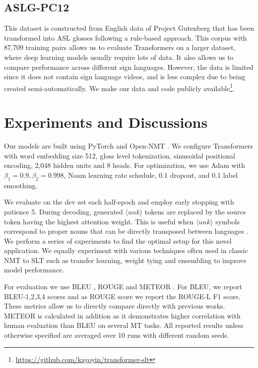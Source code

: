 \documentclass[11pt]{article}
\begin{document}
\subsection*{ASLG-PC12 \cite{asl}}  This dataset is constructed from English data of Project Gutenberg that has been transformed into ASL glosses following a rule-based approach. This corpus with 87,709 training pairs allows us to evaluate Transformers on a larger dataset, where deep learning models usually require lots of data. It also allows us to compare performance across different sign languages. However, the data is limited since it does not contain sign language videos, and is less complex due to being created semi-automatically. We make our data and code publicly available\footnote{\url{https://github.com/kayoyin/transformer-slt}}.



\section{Experiments and Discussions}
Our models are built using PyTorch \cite{pytorch} and Open-NMT \cite{opennmt}. We configure Transformers with word embedding size 512, gloss level tokenization, sinusoidal positional encoding, 2,048 hidden units and 8 heads. For optimization, we use Adam \cite{adam} with $\beta_1 = 0.9, \beta_2 = 0.998$, Noam learning rate schedule, 0.1 dropout, and 0.1 label smoothing. 

We evaluate on the dev set each half-epoch and employ early stopping with patience 5. During decoding, generated $\langle unk \rangle$ tokens are replaced by the source token having the highest attention weight. This is useful when $\langle unk \rangle$ symbols correspond to proper nouns that can be directly transposed between languages \cite{opennmt}. We perform a series of experiments to find the optimal setup for this novel application. We equally experiment with various techniques often used in classic NMT to SLT such as transfer learning, weight tying and ensembling to improve model performance.

For evaluation we use BLEU \cite{bleu}, ROUGE \cite{rouge} and METEOR \cite{meteor}. For BLEU, we report BLEU-1,2,3,4 scores and as ROUGE score we report the ROUGE-L F1 score. These metrics allow us to directly compare directly with previous works. METEOR is calculated in addition as it demonstrates higher correlation with human evaluation than BLEU on several MT tasks. All reported results unless otherwise specified are averaged over 10 runs with different random seeds.
\end{document}

